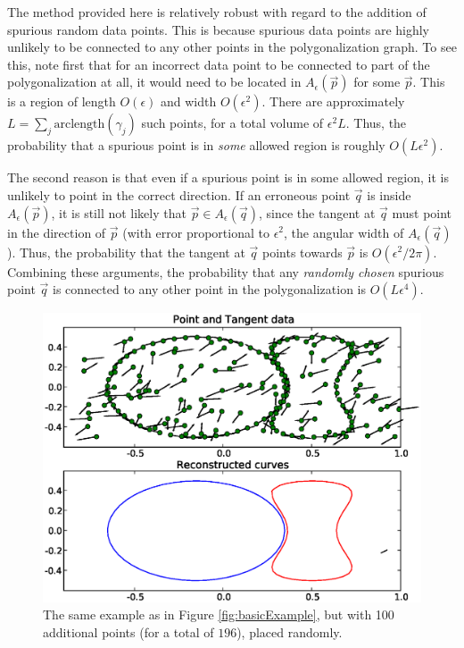 \documentclass{article}
\numberwithin{cntr}{section}
\numberwithin{equation}{section}
\newcommand{\vp}[0]{{\vec{p}}}
\newcommand{\vq}[0]{{\vec{q}}}
\newcommand{\allowed}[2]{ { A_{#1}(#2) } }
\begin{document}
The method provided here is relatively robust with regard to the
addition of spurious random data points. This is because spurious data
points are highly unlikely to be connected to any other points in the
polygonalization graph. To see this, note
first that for an incorrect data point to be connected to part of the
polygonalization at all, it would need to be located in
$\allowed{\epsilon}{\vp}$ for some $\vp$.
This is a region of length $O(\epsilon)$ and width $O(\epsilon^{2})$.
There are approximately $L = \sum_{j} \textrm{arclength}(\gamma_{j})$
such points, for a total volume of $\epsilon^{2} L$. Thus, the probability
that a spurious point is in \emph{some} allowed region is roughly
$O(L \epsilon^{2})$.

The second reason is that even if a spurious point is in some allowed region,
it is unlikely to point in the correct direction.
If an erroneous point $\vq$ is inside $\allowed{\epsilon}{\vp}$, it is
still not likely that $\vp \in \allowed{\epsilon}{\vq}$, since
the tangent at $\vq$ must point in the direction of $\vp$
(with error proportional to $\epsilon^{2}$, the angular width of
$\allowed{\epsilon}{\vq}$). Thus, the probability that the tangent at
$\vq$ points towards $\vp$ is $O(\epsilon^{2}/2\pi)$.
Combining these arguments, the probability that any \emph{randomly chosen}
spurious point $\vq$ is connected to any other point in the
polygonalization is $O(L \epsilon^{4})$.

\begin{figure}
\setlength{\unitlength}{0.240900pt}
\ifx\plotpoint\undefined\newsavebox{\plotpoint}\fi
\sbox{\plotpoint}{\rule[-0.200pt]{0.400pt}{0.400pt}}%
\includegraphics[scale=0.5]{noisy_example.eps}
\caption{The same example as in Figure \ref{fig:basicExample}, but with
100 additional points (for a total of $196$), placed randomly. }
\label{fig:noisyExample}
\end{figure}
\end{document}
